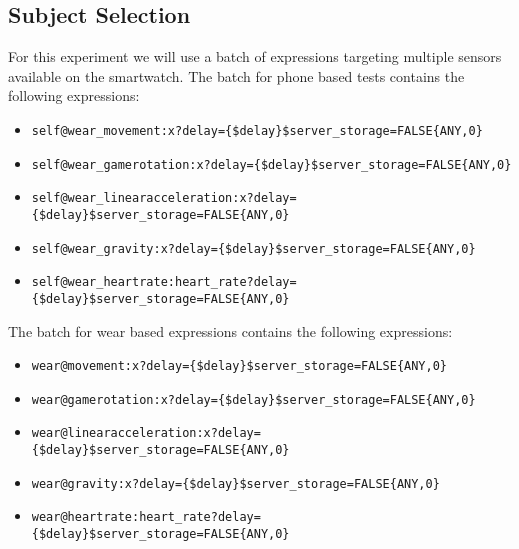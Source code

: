 \subsection{Subject Selection}
For this experiment we will use a batch of expressions targeting multiple sensors available on the smartwatch.
The batch for phone based tests contains the following expressions:
\begin{itemize}
 \item \begin{verbatim}self@wear_movement:x?delay={$delay}$server_storage=FALSE{ANY,0}\end{verbatim}
 \item \begin{verbatim}self@wear_gamerotation:x?delay={$delay}$server_storage=FALSE{ANY,0}\end{verbatim}
 \item \begin{verbatim}self@wear_linearacceleration:x?delay={$delay}$server_storage=FALSE{ANY,0}\end{verbatim}
 \item \begin{verbatim}self@wear_gravity:x?delay={$delay}$server_storage=FALSE{ANY,0}\end{verbatim}
 \item \begin{verbatim}self@wear_heartrate:heart_rate?delay={$delay}$server_storage=FALSE{ANY,0}\end{verbatim}
\end{itemize}

The batch for wear based expressions contains the following expressions:
\begin{itemize}
 \item \begin{verbatim}wear@movement:x?delay={$delay}$server_storage=FALSE{ANY,0}\end{verbatim}
 \item \begin{verbatim}wear@gamerotation:x?delay={$delay}$server_storage=FALSE{ANY,0}\end{verbatim}
 \item \begin{verbatim}wear@linearacceleration:x?delay={$delay}$server_storage=FALSE{ANY,0}\end{verbatim}
 \item \begin{verbatim}wear@gravity:x?delay={$delay}$server_storage=FALSE{ANY,0}\end{verbatim}
 \item \begin{verbatim}wear@heartrate:heart_rate?delay={$delay}$server_storage=FALSE{ANY,0}\end{verbatim}
\end{itemize}

